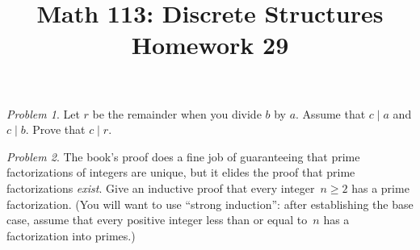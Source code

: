 \documentclass[11pt,twoside]{amsart}
\title{Math 113: Discrete Structures\\ Homework 29}
\theoremstyle{plain}
\theoremstyle{remark}
\newtheorem{prob}{Problem}
\theoremstyle{definition}
\theoremstyle{definition}
\begin{document}
\maketitle



\begin{prob}
Let $r$ be the remainder when you divide $b$ by $a$.  Assume that $c\mid a$ and
$c\mid b$.  Prove that $c\mid r$.
\end{prob}

\begin{prob}
  The book's proof does a fine job of guaranteeing that prime factorizations of
  integers are unique, but it elides the proof that prime factorizations
  \emph{exist}.  Give an inductive proof that every integer~$n\geq 2$ has a
  prime factorization. (You will want to use ``strong induction'': after
    establishing the base case, assume that every positive integer less than or
  equal to~$n$ has a factorization into primes.)
\end{prob}
\end{document}

